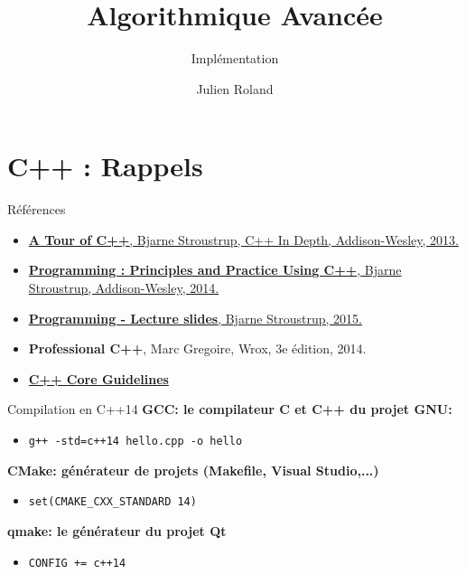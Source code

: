 \documentclass[handout]{beamer}
\title{Algorithmique Avancée}
\subtitle{Implémentation}
\author{Julien Roland}
\begin{document}
\lstset{language=c++, basicstyle=\small, columns=fullflexible, inputencoding=utf8/latin1}
\maketitle

\section{C++ : Rappels}

\begin{frame}[t]{Références}
    \begin{itemize}
        \item \href{http://www.informit.com/store/tour-of-c-plus-plus-9780133549010}{\textbf{A Tour of C++}, Bjarne Stroustrup, C++ In Depth, Addison-Wesley, 2013.}
        \item \href{http://www.stroustrup.com/Programming/}{\textbf{Programming : Principles and Practice Using C++}, Bjarne Stroustrup, Addison-Wesley, 2014.}
        \item \href{http://www.stroustrup.com/Programming/lecture-slides.html}{\textbf{Programming - Lecture slides}, Bjarne Stroustrup, 2015.}
        \item \textbf{Professional C++}, Marc Gregoire, Wrox, 3e édition, 2014.
        \item \href{http://isocpp.github.io/CppCoreGuidelines/CppCoreGuidelines}{\textbf{C++ Core Guidelines}}
    \end{itemize}
\end{frame}

\begin{frame}[t]{Compilation en C++14}
    \textbf{GCC: le compilateur C et C++ du projet GNU:}
    \begin{itemize}
        \item \lstinline{g++ -std=c++14 hello.cpp -o hello}
    \end{itemize}
    \textbf{CMake: générateur de projets (Makefile, Visual Studio,...)}
    \begin{itemize}
        \item \lstinline{set(CMAKE_CXX_STANDARD 14)}
    \end{itemize}
    \textbf{qmake: le générateur du projet Qt}
    \begin{itemize}
        \item \lstinline{CONFIG += c++14}
    \end{itemize}
\end{frame}
\end{document}
